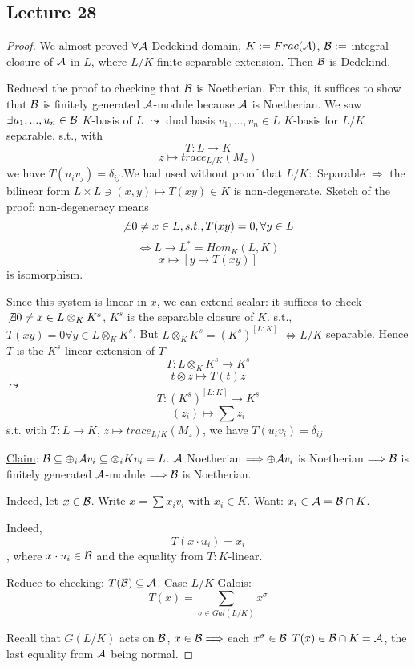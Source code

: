 \documentclass[11pt]{article}
\newcommand{\cala}{{\cal A}}
\newcommand{\calb}{{\cal B}}
\newcommand{\Lrta}{\Longrightarrow}
\newcommand{\lrta}{\longrightarrow}
\newcommand{\Llrta}{\Longleftrightarrow}
\begin{document}
\subsection{Lecture 28}
\begin{proof}
We almost proved
$\forall \cala$ Dedekind domain, $K:=Frac(\cala)$, $\calb:=$ integral closure of $\cala$ in $L$, where $L/K$ finite separable extension. Then $\calb$ is Dedekind.

Reduced the proof to checking that $\calb$ is Noetherian. For this, it suffices to show that $\calb$ is finitely generated $\cala$-module because $\cala$ is Noetherian. We saw $\exists u_1,...,u_n\in\calb$ $K$-basis of $L$ $\leadsto$ dual basis $v_1,...,v_n\in L$ $K$-basis for $L/K$ separable. s.t., with
 $$T:L\lrta K$$
$$z\longmapsto trace_{L/K}(M_z)$$
we have $T(u_iv_j)=\delta_{ij}$.We had used without proof that $L/K:$ Separable $\Lrta $ the bilinear form $L\times L\ni (x,y)\longmapsto T(xy)\in K$ is non-degenerate. Sketch of the proof: non-degeneracy means 
$$
\not\exists 0\neq x\in L, s.t., T(xy)=0,\forall y\in L
$$
$$
\Llrta L \lrta L^*=Hom_{K}(L,K)
$$
$$
x\longmapsto [y\mapsto T(xy)] 
$$
is isomorphism.

Since this system is linear in $x$, we can extend scalar: it suffices to check $\not \exists 0\neq x\in L\otimes_K K^s$, $K^s$ is the separable closure of $K$. s.t., $T(xy)=0\forall y\in L\otimes_K K^s$. But $L\otimes_K K^s=(K^s)^{[L:K]}$ $\Llrta L/K$ separable. Hence $T$ is the $K^s$-linear extension of $T$
$$
T:L\otimes_K K^s\lrta K^s
$$
$$
t\otimes z\longmapsto T(t)z
$$
$\leadsto$
$$
T:(K^s)^{[L:K]}\lrta K^s
$$
$$
(z_i)\longmapsto \sum z_i
$$
s.t.  with $T:L\lrta K$, $z\longmapsto trace_{L/K}(M_z)$, we have $T(u_i v_i)=\delta_{ij}$

\underline{Claim}: $\calb\subseteq \oplus_i \cala v_i\subseteq \otimes_i K v_i=L$. $\cala$ Noetherian $\Lrta \oplus \cala v_i$ is Noetherian $\Lrta \calb$ is finitely generated $\cala$-module $\Lrta \calb$ is Noetherian.

Indeed, let $x\in \calb$. Write $x=\sum x_i v_i$ with $x_i\in K$. \underline{Want:} $x_i\in \cala=\calb\cap K$.

Indeed, 
$$
T(x\cdot u_i)=x_i
$$
, where $x\cdot u_i\in\calb$ and the equality from $T:K$-linear.

Reduce to checking: $T(\calb)\subseteq \cala$. Case $L/K$ Galois:
$$
T(x)=\sum_{\sigma\in Gal(L/K)
} x^\sigma
$$

Recall that $G(L/K) $ acts on $\calb$, $x\in \calb\Lrta $ each $x^\sigma\in \calb$ $T(x)\in\calb\cap K=\cala$, the last equality from $\cala$ being normal.


\end{proof}
\end{document}

